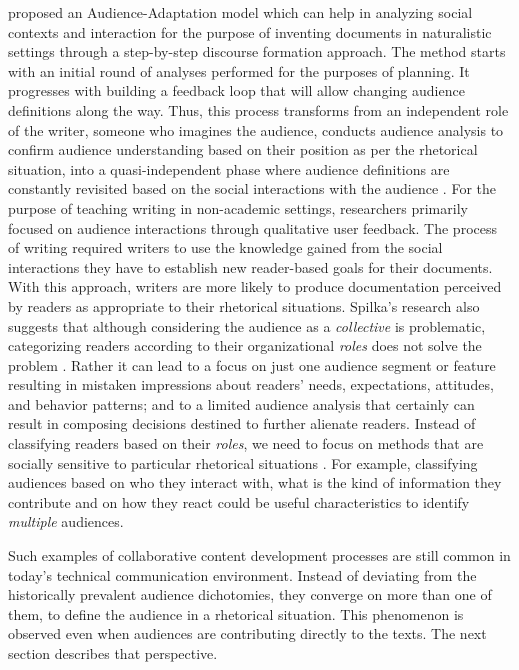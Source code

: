 \textcite{spilka1990orality} proposed an Audience-Adaptation model which can help in analyzing social contexts and interaction for the purpose of inventing documents in naturalistic settings through a step-by-step discourse formation approach. The method starts with an initial round of analyses performed for the purposes of planning. It progresses with building a feedback loop that will allow changing audience definitions along the way. Thus, this process transforms from an independent role of the writer, someone who imagines the audience, conducts audience analysis to confirm audience understanding based on their position as per the rhetorical situation, into a quasi-independent phase where audience definitions are constantly revisited based on the social interactions with the audience  \cite{spilka1990orality} . For the purpose of teaching writing in non-academic settings, researchers primarily focused on audience interactions through qualitative user feedback. The process of writing required writers to use the knowledge gained from the social interactions they have to establish new reader-based goals for their documents. With this approach, writers are more likely to produce documentation perceived by readers as appropriate to their rhetorical situations. Spilka’s research also suggests that although considering the audience as a \textit{collective} is problematic, categorizing readers according to their organizational \textit{roles} does not solve the problem \cite{spilka1990orality} . Rather it can lead to a focus on just one audience segment or feature resulting in mistaken impressions about readers’ needs, expectations, attitudes, and behavior patterns; and to a limited audience analysis that certainly can result in composing decisions destined to further alienate readers. Instead of classifying readers based on their \textit{roles}, we need to focus on methods that are socially sensitive to particular rhetorical situations  \cite{spilka1990orality}. For example, classifying audiences based on who they interact with, what is the kind of information they contribute and on how they react could be useful characteristics to identify \textit{multiple} audiences.

Such examples of collaborative content development processes are still common in today’s technical communication environment. Instead of deviating from the historically prevalent audience dichotomies, they converge on more than one of them, to define the audience in a rhetorical situation. This phenomenon is observed even when audiences are contributing directly to the texts. The next section describes that perspective.

